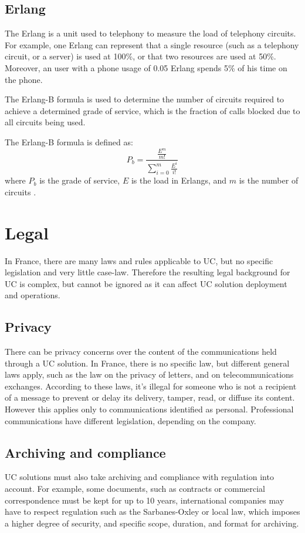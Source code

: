 \subsection{Erlang}
The Erlang is a unit used to telephony to measure the load of telephony circuits. For example, one Erlang can represent that a single resource (such as a telephony circuit, or a server) is used at 100\%, or that two resources are used at 50\%. Moreover, an user with a phone usage of 0.05 Erlang spends 5\% of his time on the phone.

The Erlang-B formula is used to determine the number of circuits required to achieve a determined grade of service, which is the fraction of calls blocked due to all circuits being used.

The Erlang-B formula is defined as: 
\[  P_b = \frac{\frac{E^m}{m!}} { \sum_{i=0}^m \frac{E^i}{i!}} \]
where $P_b$ is the grade of service, $E$ is the load in Erlangs, and $m$ is the number of circuits
\cite{qiao_robust_1998}.




\section{Legal}\label{background_legal}

In France, there are many laws and rules applicable to UC, but no specific legislation and very little case-law. Therefore the resulting legal background for UC is complex, but cannot be ignored as it can affect UC solution deployment and operations.

\subsection{Privacy}
There can be privacy concerns over the content of the communications held through a UC solution. In France, there is no specific law, but different general laws apply, such as the law on the privacy of letters, and on telecommunications exchanges. According to these laws, it's illegal for someone who is not a recipient of a message to prevent or delay its delivery, tamper, read, or diffuse its content\cite{_code_????,_loi_????,_loi_????-1}. However this applies only to communications identified as personal\cite{_cour_????}. Professional communications have different legislation, depending on the company.


\subsection{Archiving and compliance}
UC solutions must also take archiving and compliance with regulation into account. For example, some documents, such as contracts or commercial correspondence must be kept for up to 10 years\cite{_code_????-1,_code_????-2}, international companies may have to respect regulation such as the Sarbanes-Oxley\cite{_sarbanes-oxley_????} or local law\cite{_loi_2005}, which imposes a higher degree of security, and specific scope, duration, and format for archiving.


